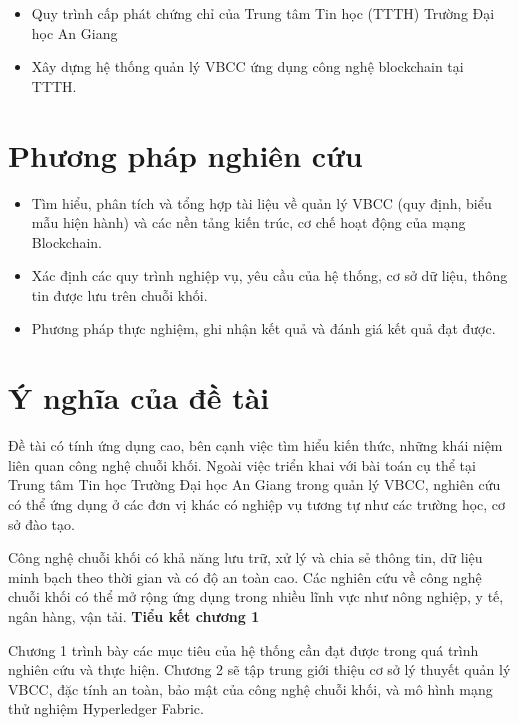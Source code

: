 \begin{itemize}
\item Quy trình cấp phát chứng chỉ của Trung tâm Tin học (TTTH) Trường Đại học An Giang
\item Xây dựng hệ thống quản lý VBCC ứng dụng công nghệ blockchain tại TTTH.
\end{itemize}

\section{Phương pháp nghiên cứu}

\begin{itemize}
\item Tìm hiểu, phân tích và tổng hợp tài liệu về quản lý VBCC (quy định, biểu mẫu hiện hành) và các nền tảng kiến trúc, cơ chế hoạt động của mạng Blockchain.
\item Xác định các quy trình nghiệp vụ, yêu cầu của hệ thống, cơ sở dữ liệu, thông tin được lưu trên chuỗi khối.
\item Phương pháp thực nghiệm, ghi nhận kết quả và đánh giá kết quả đạt được.
\end{itemize}
\section{Ý nghĩa của đề tài}

Đề tài có tính ứng dụng cao, bên cạnh việc tìm hiểu kiến thức, những khái niệm liên quan công nghệ chuỗi khối.
Ngoài việc triển khai với bài toán cụ thể tại Trung tâm Tin học Trường Đại học An Giang trong quản lý VBCC, nghiên cứu có thể ứng dụng ở các đơn vị khác có nghiệp vụ tương tự như các trường học, cơ sở đào tạo.

Công nghệ chuỗi khối có khả năng lưu trữ, xử lý và chia sẻ thông tin, dữ liệu minh bạch theo thời gian và có độ an toàn cao. Các nghiên cứu về công nghệ chuỗi khối có thể mở rộng ứng dụng trong nhiều lĩnh vực như nông nghiệp, y tế, ngân hàng, vận tải.
\textbf{Tiểu kết chương 1}

Chương 1 trình bày các mục tiêu của hệ thống cần đạt được trong quá trình nghiên cứu và thực hiện. Chương 2 sẽ tập trung giới thiệu cơ sở lý thuyết quản lý VBCC, đặc tính an toàn, bảo mật của công nghệ chuỗi khối, và mô hình mạng thử nghiệm Hyperledger Fabric.
